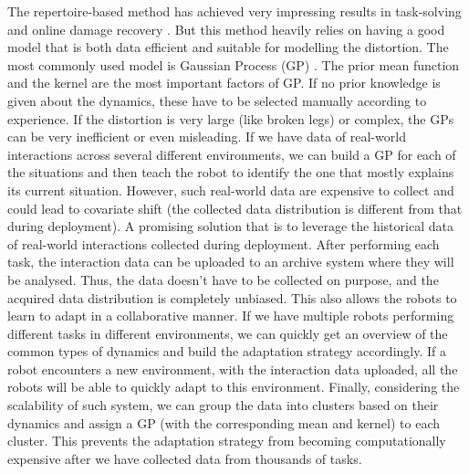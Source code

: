 \documentclass[journal]{IEEEtran}
\begin{document}
The repertoire-based method has achieved very impressing results in task-solving \cite{EvoRBC} and online damage recovery \cite{RTE}. 
But this method heavily relies on having a good model that is both data efficient and suitable for modelling the distortion. 
The most commonly used model is Gaussian Process (GP) \cite{GP}. The prior mean function and the kernel are the most important factors of GP. 
If no prior knowledge is given about the dynamics, these  have to be selected manually according to experience.
If the distortion is very large (like broken legs) or complex, the GPs can be very inefficient or even misleading.
If we have data of real-world interactions across several different environments, we can build a GP for each of the situations and then teach the robot to identify the one that mostly explains its current situation. However, such real-world data are expensive to collect and could lead to covariate shift (the collected data distribution is different from that during deployment).
A promising solution that is to leverage the historical data of real-world interactions collected during deployment. 
After performing each task, the interaction data can be uploaded to an archive system where they will be analysed. 
Thus, the data doesn't have to be collected on purpose, and the acquired data distribution is completely unbiased. 
This also allows the robots to learn to adapt in a collaborative manner.
If we have multiple robots performing different tasks in different environments, we can quickly get an overview of the  common types of dynamics and build the adaptation strategy accordingly. 
If a robot encounters a new environment, with the interaction data uploaded, all the robots will be able to quickly adapt to this environment.
Finally, considering the scalability of such system, we can group the data into clusters based on their dynamics and assign a GP (with the corresponding mean and kernel) to each cluster. This prevents the adaptation strategy from becoming computationally expensive after we have collected data from thousands of tasks.
\end{document}
